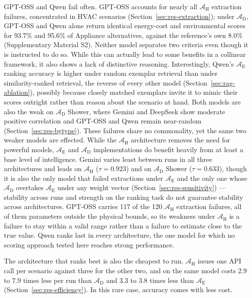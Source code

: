 \documentclass[final,3p,times]{elsarticle}
\begin{document}
GPT-OSS and Qwen fail often. GPT-OSS accounts for nearly all $\mathcal{A}_{\text{H}}$ extraction failures, concentrated in HVAC scenarios (Section~\ref{sec:res-extraction}); under $\mathcal{A}_{\text{D}}$, GPT-OSS and Qwen alone return identical energy-cost and environmental scores for 93.7\% and 95.6\% of Appliance alternatives, against the reference's own 8.0\% (Supplementary Material S2). Neither model separates two criteria even though it is instructed to do so. While this can actually lead to some benefits in a collinear framework, it also shows a lack of distinctive reasoning. Interestingly, Qwen's $\mathcal{A}_{\text{E}}$ ranking accuracy is higher under random exemplar retrieval than under similarity-ranked retrieval, the reverse of every other model (Section~\ref{sec:rag-ablation}), possibly because closely matched exemplars invite it to mimic their scores outright rather than reason about the scenario at hand. Both models are also the weak on  $\mathcal{A}_{\text{D}}$ Shower, where Gemini and DeepSeek show moderate positive correlation and GPT-OSS and Qwen remain near-random (Section~\ref{sec:res-bytype}). These failures share no commonality, yet the same two weaker models are effected. While the $\mathcal{A}_{\text{H}}$ architecture removes the need for powerful models, $\mathcal{A}_{\text{E}}$ and $\mathcal{A}_{\text{D}}$ implementations do benefit heavily from at least a base level of intelligence.  Gemini varies least between runs in all three architectures and leads on $\mathcal{A}_{\text{H}}$ ($\tau = 0.923$) and on $\mathcal{A}_{\text{D}}$ Shower ($\tau = 0.633$), though it is also the only model that failed extractions under $\mathcal{A}_{\text{E}}$ and the only one whose $\mathcal{A}_{\text{D}}$ overtakes $\mathcal{A}_{\text{E}}$ under any weight vector (Section~\ref{sec:res-sensitivity}) — stability across runs and strength on the ranking task do not guarantee stability across architectures. GPT-OSS carries 117 of the 120 $\mathcal{A}_{\text{H}}$ extraction failures, all of them parameters outside the physical bounds, so its weakness under $\mathcal{A}_{\text{H}}$ is a failure to stay within a valid range rather than a failure to estimate close to the true value. Qwen ranks last in every architecture, the one model for which no scoring approach tested here reaches strong performance.

The architecture that ranks best is also the cheapest to run. $\mathcal{A}_{\text{H}}$ issues one API call per scenario against three for the other two, and on the same model costs 2.9 to 7.9 times less per run than $\mathcal{A}_{\text{D}}$ and 3.3 to 3.8 times less than $\mathcal{A}_{\text{E}}$ (Section~\ref{sec:res-efficiency}). In this rare case, accuracy comes with less cost. 
\end{document}
